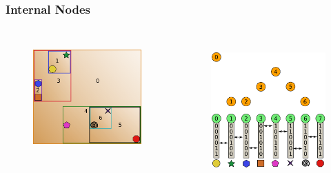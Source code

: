\documentclass{beamer}
\begin{document}
\begin{frame}
  \frametitle{Internal Nodes}
  
\begin{columns}[t]

\begin{figure}
\includegraphics[height=45mm]{primitive-box.png}
\end{figure}

\begin{figure}
\includegraphics[height=55mm]{algo_0.png}
\end{figure}
\end{columns}
\end{frame}
\end{document}
